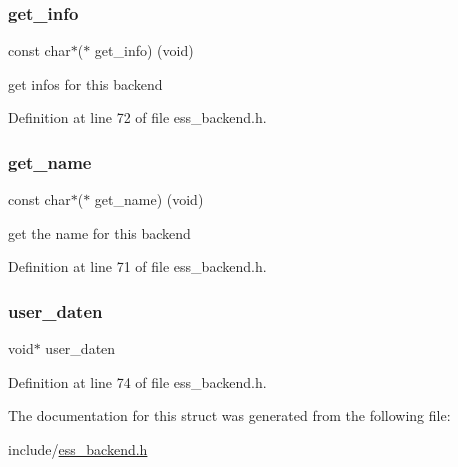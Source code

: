 \subsubsection{\texorpdfstring{get\+\_\+info}{get\_info}}
{\footnotesize\ttfamily const char$\ast$($\ast$  get\+\_\+info) (void)}

get infos for this backend 

Definition at line 72 of file ess\+\_\+backend.\+h.

\mbox{\label{structess__backend_a1e8975441f4fbb374da179cc7e8bcbae}} 
\subsubsection{\texorpdfstring{get\+\_\+name}{get\_name}}
{\footnotesize\ttfamily const char$\ast$($\ast$  get\+\_\+name) (void)}

get the name for this backend 

Definition at line 71 of file ess\+\_\+backend.\+h.

\mbox{\label{structess__backend_a5ad8569143b4728c7b7f91c53661d8b5}} 
\subsubsection{\texorpdfstring{user\+\_\+daten}{user\_daten}}
{\footnotesize\ttfamily void$\ast$ user\+\_\+daten}



Definition at line 74 of file ess\+\_\+backend.\+h.



The documentation for this struct was generated from the following file\+:\begin{DoxyCompactItemize}
\item 
include/\hyperlink{ess__backend_8h}{ess\+\_\+backend.\+h}\end{DoxyCompactItemize}

